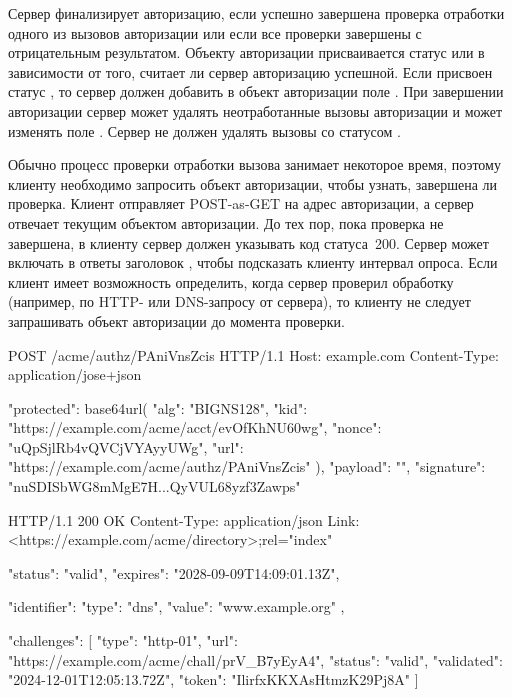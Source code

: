 Сервер финализирует авторизацию, если успешно завершена проверка отработки 
одного из вызовов авторизации или если все проверки завершены с отрицательным 
результатом.
%
%
Объекту авторизации присваивается статус  или  
в зависимости от того, считает ли сервер авторизацию успешной. Если присвоен 
статус , то сервер должен добавить в объект авторизации  
поле . При завершении авторизации сервер может удалять 
неотработанные вызовы авторизации и может изменять поле . 
Сервер не должен удалять вызовы со статусом . 
 
Обычно процесс проверки отработки вызова занимает некоторое время, поэтому 
клиенту необходимо запросить объект авторизации, чтобы узнать, завершена 
ли проверка. 
%
Клиент отправляет  POST-as-GET на адрес 
авторизации, а сервер отвечает текущим объектом авторизации. До тех пор, пока 
проверка не завершена, в  клиенту сервер 
должен указывать код статуса~200. Сервер может включать в ответы заголовок 
, чтобы подсказать клиенту интервал опроса. 
%
Если клиент имеет возможность определить, когда сервер проверил обработку 
(например, по HTTP- или DNS-запросу от сервера), то клиенту не следует 
запрашивать объект авторизации до момента проверки.

\begin{codeblock}
POST /acme/authz/PAniVnsZcis HTTP/1.1
Host: example.com
Content-Type: application/jose+json

{
  "protected": base64url({
    "alg": "BIGNS128",
    "kid": "https://example.com/acme/acct/evOfKhNU60wg",
    "nonce": "uQpSjlRb4vQVCjVYAyyUWg",
    "url": "https://example.com/acme/authz/PAniVnsZcis"
  }),
  "payload": "",
  "signature": "nuSDISbWG8mMgE7H...QyVUL68yzf3Zawps"
}
\end{codeblock}

\begin{codeblock}
HTTP/1.1 200 OK
Content-Type: application/json
Link: <https://example.com/acme/directory>;rel="index"

{
  "status": "valid",
  "expires": "2028-09-09T14:09:01.13Z",

  "identifier": {
    "type": "dns",
    "value": "www.example.org"
  },

  "challenges": [
    {
      "type": "http-01",
      "url": "https://example.com/acme/chall/prV_B7yEyA4",
      "status": "valid",
      "validated": "2024-12-01T12:05:13.72Z",
      "token": "IlirfxKKXAsHtmzK29Pj8A"
    }
  ]
}
\end{codeblock}
\fi

